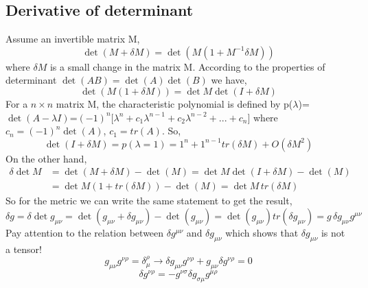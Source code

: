 \documentclass[a4paper,14pt]{article}
\newcommand {\be}{\begin{equation}}
\newcommand {\ee}{\end{equation}}
\begin{document}
\begin{appendices}
\section{Derivative of determinant} \label{A1}
Assume an invertible matrix M,
\be
\det\left( M+\delta M \right) =\det \left( M\left( 1+M^{-1}\delta M\right) \right)
\ee
where $\delta M$ is a small change in the matrix M. According to the properties of determinant $\det\left( AB\right) =\det\left( A\right) \det\left( B\right) 
$ we have,
\be
\det\left( M\left( 1+\delta M\right) \right) =\det M\det\left( I+\delta M\right) 
\ee
For a $n \times n$ matrix M, the characteristic polynomial is defined by p($\lambda$)=$\det (A- \lambda I)$=$(-1)^n \Big[ \lambda ^n +c _1 \lambda ^{n-1} + c _2 \lambda ^{n-2}  +...+c_n \Big]$  where $c_n=(-1)^n \det( A)$, $c_1=tr (A)$. So,
\be
\det\left( I+\delta M\right) =p(\lambda=1)=1^{n}+1^{n-1}tr\left( \delta M\right) +O\left( \delta M^{2} \right) 
\ee
On the other hand,
\begin{align}
\delta\det M&=\det\left( M+\delta M\right) -\det\left( M\right) =\det M\det\left( I+\delta M\right) -\det\left( M\right) \nonumber \\ &
=\det M (1+ tr(\delta M)) -\det\left( M\right)= \det M  \, tr (\delta M)
\end{align}
So for the metric we can write the same statement to get the result,
\be
\delta g =\delta \det g_{\mu \nu}=  \det (g_{\mu \nu}+ \delta g_{\mu \nu}) - \det (g_{\mu \nu}) = \det (g_{\mu \nu}) tr (\delta g_{\mu \nu}) = g \, \delta g_{\mu\nu}g^{\mu\nu}
\ee
Pay attention to the relation between $\delta g^{\mu \nu}$ and $\delta g_ {\mu \nu}$ which shows that $\delta g_{\mu \nu}$ is not a tensor!
\be
g_{\mu\nu}g^{\nu\rho}=\delta^{\rho}_{\mu} \rightarrow
\delta g_{\mu\nu}g^{\nu\rho}+g_{\mu\nu}\delta g^{\nu\rho}=0 
\ee
\be
\delta g^{\nu\rho}=-g^{\nu\sigma}\delta g_{\sigma\mu}g^{\mu\rho}
\ee
\end{appendices}
\end{document}
